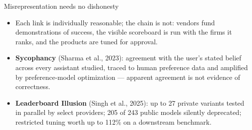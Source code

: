 \documentclass[11pt]{beamer}
\begin{document}
\begin{frame}{Misrepresentation needs no dishonesty}
  \begin{itemize}
    \item Each link is individually reasonable; the chain is not:
          vendors fund demonstrations of success, the visible scoreboard is
          run with the firms it ranks, and the products are tuned for
          approval.
    \item \textbf{Sycophancy} (Sharma et al., 2023): agreement with the
          user's stated belief across every assistant studied, traced to
          human preference data and amplified by preference-model
          optimization --- apparent agreement is not evidence of correctness.
    \item \textbf{Leaderboard Illusion} (Singh et al., 2025): up to
          \alert{27 private variants} tested in parallel by select
          providers; \alert{205 of 243} public models silently deprecated;
          restricted tuning worth up to \alert{112\%} on a downstream
          benchmark.
  \end{itemize}
\end{frame}
\end{document}
